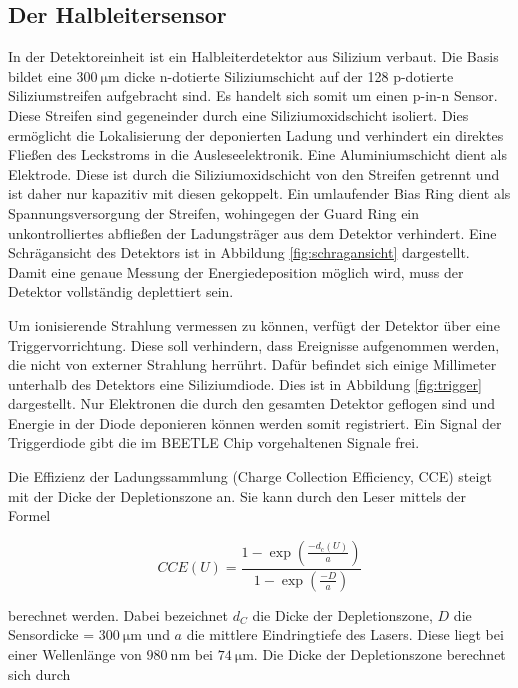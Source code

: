 \subsection{Der Halbleitersensor}

In der Detektoreinheit ist ein Halbleiterdetektor aus Silizium verbaut.
Die Basis bildet eine $\SI{300}{\micro\metre}$ dicke n-dotierte Siliziumschicht auf der 128 p-dotierte Siliziumstreifen aufgebracht sind.
Es handelt sich somit um einen p-in-n Sensor.
Diese Streifen sind gegeneinder durch eine Siliziumoxidschicht isoliert.
Dies ermöglicht die Lokalisierung der deponierten Ladung und verhindert ein direktes Fließen des Leckstroms in die Ausleseelektronik.
Eine Aluminiumschicht dient als Elektrode.
Diese ist durch die Siliziumoxidschicht von den Streifen getrennt und ist daher nur kapazitiv mit diesen gekoppelt.
Ein umlaufender Bias Ring dient als Spannungsversorgung der Streifen, wohingegen der Guard Ring ein unkontrolliertes abfließen der Ladungsträger aus dem Detektor verhindert.
Eine Schrägansicht des Detektors ist in Abbildung \ref{fig:schragansicht} dargestellt.
Damit eine genaue Messung der Energiedeposition möglich wird, muss der Detektor vollständig deplettiert sein.

Um ionisierende Strahlung vermessen zu können, verfügt der Detektor über eine Triggervorrichtung.
Diese soll verhindern, dass Ereignisse aufgenommen werden, die nicht von externer Strahlung herrührt.
Dafür befindet sich einige Millimeter unterhalb des Detektors eine Siliziumdiode.
Dies ist in Abbildung \ref{fig:trigger} dargestellt.
Nur Elektronen die durch den gesamten Detektor geflogen sind und Energie in der Diode deponieren können werden somit registriert.
Ein Signal der Triggerdiode gibt die im BEETLE Chip vorgehaltenen Signale frei.

Die Effizienz der Ladungssammlung (Charge Collection Efficiency, CCE) steigt mit der Dicke der Depletionszone an.
Sie kann durch den Leser mittels der Formel

\begin{equation}
  CCE(U) = \frac{1 - \exp(\frac{-d_c(U)}{a})}{1 - \exp(\frac{-D}{a})}
\end{equation}

berechnet werden.
Dabei bezeichnet $d_C$ die Dicke der Depletionszone, $D$ die Sensordicke = $\SI{300}{\micro\metre}$ und $a$ die mittlere Eindringtiefe des Lasers.
Diese liegt bei einer Wellenlänge von $\SI{980}{\nano\metre}$ bei $\SI{74}{\micro\metre}$.
Die Dicke der Depletionszone berechnet sich durch

